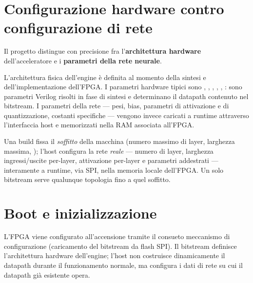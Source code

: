 \section{Configurazione hardware contro configurazione di rete}
Il progetto distingue con precisione fra l'\textbf{architettura hardware}
dell'acceleratore e i \textbf{parametri della rete neurale}.

L'architettura fisica dell'engine è definita al momento della sintesi e
dell'implementazione dell'FPGA. I parametri hardware tipici sono ,
, , , ,
: sono parametri Verilog risolti in fase di sintesi e determinano il
datapath contenuto nel bitstream. I parametri della rete --- pesi, bias, parametri di
attivazione e di quantizzazione, costanti specifiche --- vengono invece caricati a
runtime attraverso l'interfaccia host e memorizzati nella RAM associata all'FPGA.

\begin{fnnote}
Una build fissa il \emph{soffitto} della macchina (numero massimo di layer, larghezza
massima, ); l'host configura la rete \emph{reale} --- numero di layer,
larghezza ingressi/uscite per-layer, attivazione per-layer e parametri addestrati ---
interamente a runtime, via SPI, nella memoria locale dell'FPGA. Un solo bitstream
serve qualunque topologia fino a quel soffitto.
\end{fnnote}

\section{Boot e inizializzazione}
L'FPGA viene configurato all'accensione tramite il consueto meccanismo di
configurazione (caricamento del bitstream da flash SPI). Il bitstream definisce
l'architettura hardware dell'engine; l'host non costruisce dinamicamente il datapath
durante il funzionamento normale, ma configura i dati di rete su cui il datapath già
esistente opera.

\begin{center}
\end{center}


